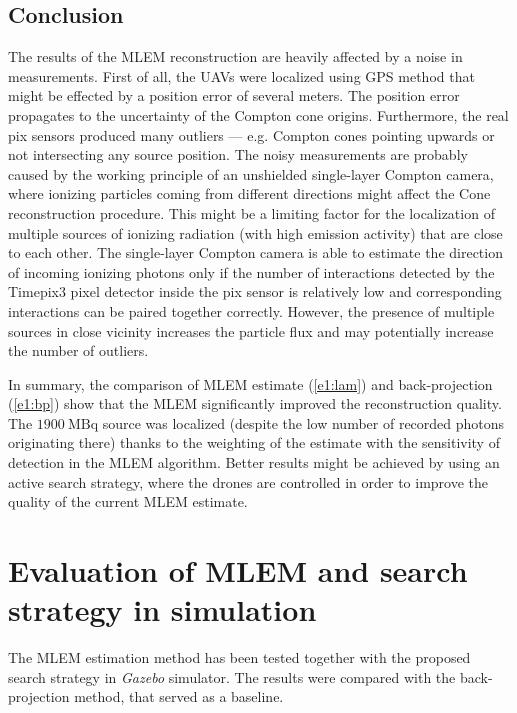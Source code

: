 \subsection{Conclusion}
The results of the \ac{MLEM} reconstruction are heavily affected by a noise in measurements.
First of all, the \ac{UAV}s were localized using \ac{GPS} method that might be effected by a position error of several meters.
The position error propagates to the uncertainty of the Compton cone origins.
Furthermore, the real \ac{pix} sensors produced many outliers --- e.g. Compton cones pointing upwards or not intersecting any source position. 
The noisy measurements are probably caused by the working principle of an unshielded single-layer Compton camera, where ionizing particles coming from different directions might affect the Cone reconstruction procedure.
This might be a limiting factor for the localization of multiple sources of ionizing radiation (with high emission activity) that are close to each other.
The single-layer Compton camera is able to estimate the direction of incoming ionizing photons only if the number of interactions detected by the Timepix3 pixel detector inside the \ac{pix} sensor is relatively low and corresponding interactions can be paired together correctly.
However, the presence of multiple sources in close vicinity increases the particle flux and may potentially increase the number of outliers.

In summary, the comparison of \ac{MLEM} estimate (\autoref{e1:lam}) and back-projection (\autoref{e1:bp}) show that the \ac{MLEM} significantly improved the reconstruction quality.
The $\SI{1900}{\mega\becquerel}$ source was localized (despite the low number of recorded photons originating there) 
thanks to the weighting of the estimate with the sensitivity of detection in the \ac{MLEM} algorithm.
Better results might be achieved by using an active search strategy, where the drones are controlled in order to improve the quality of the current \ac{MLEM} estimate.










\section{Evaluation of MLEM and search strategy in simulation\label{chap:exp2}}
The \ac{MLEM} estimation method has been tested together with the proposed search strategy in \textit{Gazebo} simulator. 
The results were compared with the back-projection method, that served as a baseline.

